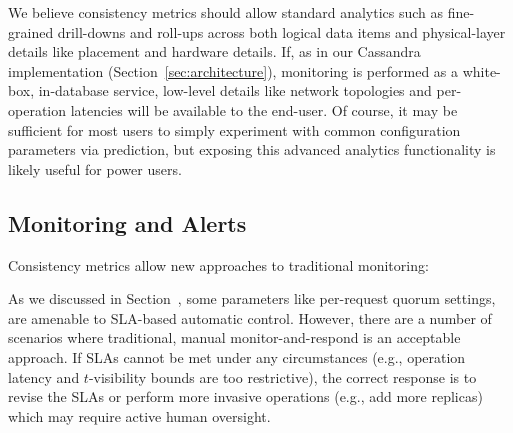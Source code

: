 We believe consistency metrics should allow standard analytics such as
fine-grained drill-downs and roll-ups across both logical data items
and physical-layer details like placement and hardware details. If, as
in our Cassandra implementation (Section~\ref{sec:architecture}),
monitoring is performed as a white-box, in-database service, low-level
details like network topologies and per-operation latencies will be
available to the end-user. Of course, it may be sufficient for most
users to simply experiment with common configuration parameters via
prediction, but exposing this advanced analytics functionality is
likely useful for power users.

\subsection{Monitoring and Alerts}
\label{sec:monitoring}

Consistency metrics allow new approaches to traditional monitoring:


As we discussed in Section~\label{sec:dynamic}, some parameters like
per-request quorum settings, are amenable to SLA-based automatic
control. However, there are a number of scenarios where traditional,
manual monitor-and-respond is an acceptable approach. If SLAs cannot
be met under any circumstances (e.g., operation latency and
$t$-visibility bounds are too restrictive), the correct response is to
revise the SLAs or perform more invasive operations (e.g., add more
replicas) which may require active human oversight.
